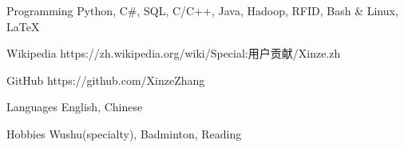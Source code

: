 

\vspace{-1.5mm}
\begin{cvskills}


\cvskill
{Programming} %
{Python, C\#, SQL, C/C++, Java, Hadoop, RFID, Bash \& Linux, \LaTeX} %


\cvskill
{Wikipedia} %
{{https://zh.wikipedia.org/wiki/Special:用户贡献/Xinze.zh}} %


\cvskill
{GitHub} %
{https://github.com/XinzeZhang} %


\cvskill
{Languages} %
{English, Chinese} %

\cvskill
{Hobbies} %
{Wushu(specialty), Badminton, Reading} %

\end{cvskills}